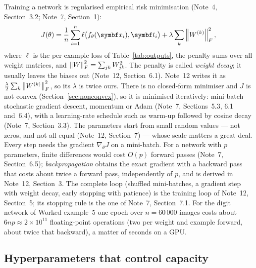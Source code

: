 \documentclass[11pt]{article}
\newcommand{\vt}{\vect{t}}
\begin{document}
Training a network is regularised empirical risk minimisation (Note~4, Section~3.2; Note~7, Section~1):
\begin{equation}\label{eq:objective}
  J(\theta) = \frac1n\sum_{i=1}^n \ell\big(f_\theta(\x_i), \vt_i\big) + \lambda\sum_{k}\norm{W^{(k)}}_F^2 ,
\end{equation}
where $\ell$ is the per-example loss of Table~\ref{tab:outputs}, the penalty sums over all weight matrices,
and $\left\lVert W \right\rVert_F^2 = \sum_{jk}W_{jk}^2$. The penalty is called \emph{weight decay}; it usually leaves the biases out
(Note~12, Section~6.1). Note~12 writes it as $\frac{\lambda}{2}\sum_k\left\lVert W^{(k)} \right\rVert_F^2$, so its $\lambda$ is twice
ours. There is no closed-form minimiser and $J$ is not convex (Section~\ref{sec:nonconvex}), so it is minimised
iteratively: mini-batch stochastic gradient descent, momentum or Adam (Note~7, Sections~5.3, 6.1 and~6.4), with a
learning-rate schedule such as warm-up followed by cosine decay (Note~7, Section~3.3). The parameters start from small
random values --- not zeros, and not all equal (Note~12, Section~7) --- whose scale matters a great deal. Every step
needs the gradient $\nabla_\theta J$ on a mini-batch. For a network with $p$ parameters, finite differences would cost
$O(p)$ forward passes (Note~7, Section~6.5); \emph{backpropagation} obtains the exact gradient with a backward pass that
costs about twice a forward pass, independently of $p$, and is derived in Note~12, Section~3. The complete loop
(shuffled mini-batches, a gradient step with weight decay, early stopping with patience) is the training loop of
Note~12, Section~5; its stopping rule is the one of Note~7, Section~7.1. For the digit network of Worked example~5 one epoch over
$n = 60\,000$ images costs about $6np \approx 2 \times 10^{11}$ floating-point operations (two per weight and example
forward, about twice that backward), a matter of seconds on a GPU.

\subsection{Hyperparameters that control capacity}\label{sec:hyper}
\end{document}
